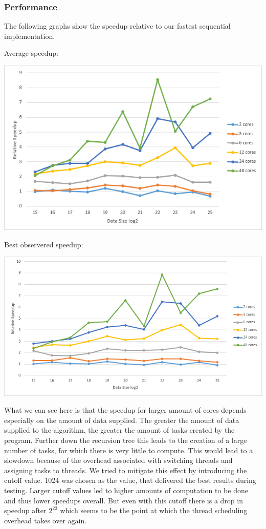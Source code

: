 \subsubsection{Performance}
The following graphs show the speedup relative to our fastest sequential implementation.

Average speedup:

\includegraphics[width=\textwidth]{omp_rec_avg.png}

\pagebreak
Best observered speedup:

\includegraphics[width=\textwidth]{omp_rec_best.png}

What we can see here is that the speedup for larger amount of cores depends especially on the amount of data supplied.
The greater the amount of data supplied to the algorithm, the greater the amount of tasks created by the program. Further down the recursion tree this leads to the creation of
a large number of tasks, for which there is very little to compute. This would lead to a slowdown because of the overhead associated with switching threads and assigning tasks to threads.
We tried to mitigate this effect by introducing the cutoff value. 1024 was chosen as the value, that delivered the best results during testing. Larger cutoff values led to higher amounts of computation to be done and thus lower speedups overall.
But even with this cutoff there is a drop in speedup after \(2^{23}\) which seems to be the point at which the thread scheduling overhead takes over again.

